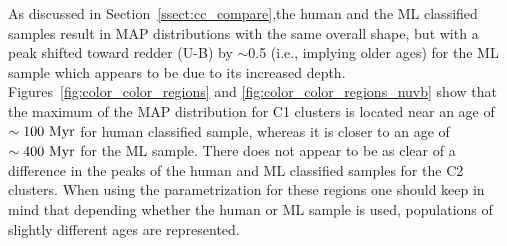 \documentclass[linenumbers]{aastex63}
\begin{document}
As discussed in Section~\ref{ssect:cc_compare},the human and the ML classified samples result in MAP distributions with the same overall shape, but with a peak shifted toward redder (U-B) by $\sim$0.5 (i.e., implying older ages) for the ML sample which appears to be due to its increased depth. Figures~\ref{fig:color_color_regions} and \ref{fig:color_color_regions_nuvb} show that the maximum of the MAP distribution for C1 clusters is located near an age of ${\rm \sim 100~Myr}$ for human classified sample, whereas it is closer to an age of ${\rm \sim 400~Myr}$ for the ML sample.  There does not appear to be as clear of a difference in the peaks of the human and ML classified samples for the C2 clusters.  When using the parametrization for these regions  one should keep in mind that depending whether the human or ML sample is used, populations of slightly different ages are represented.




\end{document}
